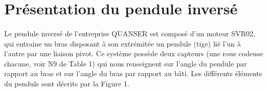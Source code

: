 \documentclass[12pt, a4paper, openany]{report}
\begin{document}
	\section*{Présentation du pendule inversé}
			
		\paragraph{}	
  Le pendule inversé de l’entreprise QUANSER est composé d’un moteur SVR02, qui entraine un bras disposant à son extrémitée un pendule (tige) lié l’un à l’autre par une liaison pivot. Ce système possède deux capteurs (une roue codeuse chacune, voir N9 de Table 1) qui nous renseignent sur l’angle du pendule par rapport au bras et sur l’angle du bras par rapport au bâti. Les différents éléments du pendule sont décrits par la Figure 1.
	
\end{document}
